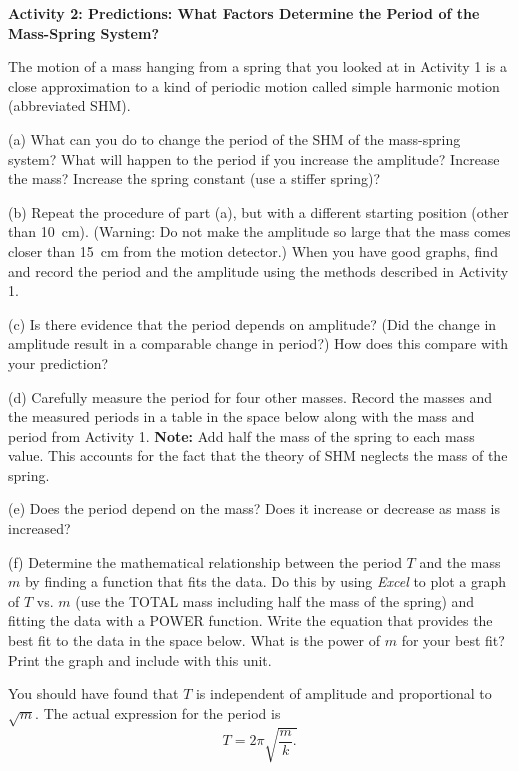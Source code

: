 \bigskip

\textbf{Activity 2: Predictions:  What Factors Determine the Period of the Mass-Spring System? }

The motion of a mass hanging from a spring that you looked at in Activity 1
is a close approximation to a kind of periodic motion called simple harmonic
motion (abbreviated SHM).

(a) What can you do to change the period of the SHM of the mass-spring system? What
will happen to the period if you increase the amplitude? Increase the mass?
Increase the spring constant (use a stiffer spring)?
\answerspace{20mm}

(b) Repeat the procedure of part (a), but with a different starting position
(other than 10~cm). (Warning: Do not make the amplitude so large that the mass
comes closer than 15~cm from the motion detector.) When you have good graphs,
find and record the period and the amplitude using the methods described in
Activity 1. 
\answerspace{15mm}


(c) Is there evidence that the period depends on amplitude? (Did the change
in amplitude result in a comparable change in period?) How does this
compare with your prediction?
\answerspace{10mm}

\pagebreak[2]
(d) Carefully measure the period for four other masses. Record the masses and
the measured periods in a table in the space below along with the mass and 
period from Activity 1. \textbf{Note:} Add half the mass of the spring to each
mass value. This accounts for the fact that the theory of SHM neglects the mass 
of the spring.
\answerspace{35mm}

(e) Does the period depend on the mass? Does it increase or decrease as mass
is increased?
\answerspace{15mm}

(f) Determine the mathematical relationship between the period $T$ and the mass
$m$ by finding a function that fits the data. Do this by using \textit{Excel} to plot 
a graph of $T$ vs. $m$ (use the TOTAL mass including half the mass of the 
spring) and fitting the data with a POWER function. Write the equation that 
provides the best fit to the data in the space below. What is the power of 
$m$ for your best fit? Print the graph and include with this unit.
\answerspace{20mm}

You should have found that $T$ is independent of amplitude 
and proportional to \( \sqrt{m} \). The actual expression for the period is
\[T=2\pi \sqrt{\frac{m}{k}.}\]


